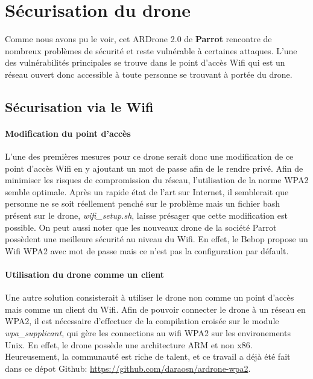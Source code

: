 \section{Sécurisation du drone}
Comme nous avons pu le voir, cet ARDrone 2.0 de \textbf{Parrot} rencontre de nombreux problèmes de sécurité et reste vulnérable à certaines attaques. L'une des vulnérabilités principales se trouve dans le point d'accès Wifi qui est un réseau ouvert donc accessible à toute personne se trouvant à portée du drone.

\subsection{Sécurisation via le Wifi}
\paragraph{Modification du point d'accès}
L'une des premières mesures pour ce drone serait donc une modification de ce point d'accès Wifi en y ajoutant un mot de passe afin de le rendre privé. Afin de minimiser les risques de compromission du réseau, l'utilisation de la norme WPA2 semble optimale. Après un rapide état de l'art sur Internet, il semblerait que personne ne se soit réellement penché sur le problème mais un fichier bash présent sur le drone, \textit{wifi\_setup.sh}, laisse présager que cette modification est possible. On peut aussi noter que les nouveaux drone de la société Parrot possèdent une meilleure sécurité au niveau du Wifi. En effet, le Bebop propose un Wifi WPA2 avec mot de passe mais ce n'est pas la configuration par défault.

\paragraph{Utilisation du drone comme un client}
Une autre solution consisterait à utiliser le drone non comme un point d'accès mais comme un client du Wifi.
Afin de pouvoir connecter le drone à un réseau en WPA2, il est nécessaire d'effectuer de la compilation croisée sur le module \textit{wpa\_supplicant}, qui gère les connections au wifi WPA2 sur les environements Unix. En effet, le drone possède une architecture ARM et non x86. Heureusement, la communauté est riche de talent, et ce travail a déjà été fait dans ce dépot Github: \url{https://github.com/daraosn/ardrone-wpa2}.\cite{ref7}\\

